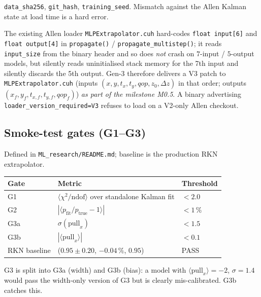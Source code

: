 \documentclass[a4paper,11pt]{article}
\newcommand{\dz}{\Delta z}
\begin{document}
\begin{description}
        \texttt{data\_sha256}, \texttt{git\_hash},
        \texttt{training\_seed}.  Mismatch against the Allen Kalman
        state at load time is a hard error.
  \item[A7 --- loader V3 patch.]  The existing Allen loader
        \texttt{MLPExtrapolator.cuh} hard-codes \texttt{float
        input[6]} and \texttt{float output[4]} in
        \texttt{propagate()} / \texttt{propagate\_multistep()}; it
        reads \texttt{input\_size} from the binary header and so
        does \emph{not} crash on $7$-input / $5$-output models, but
        silently reads uninitialised stack memory for the 7th input
        and silently discards the 5th output.  Gen-3 therefore
        delivers a V3 patch to \texttt{MLPExtrapolator.cuh} (inputs
        $(x,y,t_x,t_y,qop,z_0,\dz)$ in that order; outputs
        $(x_f,y_f,t_{x,f},t_{y,f},qop_f)$) \emph{as part of the
        milestone M0.5}.  A binary advertising
        \texttt{loader\_version\_required=V3} refuses to load on a
        V2-only Allen checkout.
\end{description}

\subsection{Smoke-test gates (G1--G3)}

Defined in \texttt{ML\_research/README.md}; baseline is the
production RKN extrapolator.

\begin{center}
\begin{tabular}{lll}
\toprule
Gate & Metric & Threshold \\
\midrule
G1 & $\langle\chi^2/\mathrm{ndof}\rangle$ over standalone Kalman fit & $<2.0$ \\
G2 & $|\langle p_\mathrm{fit}/p_\mathrm{true}-1\rangle|$            & $<1\,\%$ \\
G3a & $\sigma(\mathrm{pull}_x)$                                      & $<1.5$ \\
G3b & $|\langle\mathrm{pull}_x\rangle|$                             & $<0.1$ \\
\midrule
RKN baseline & ($0.95\pm0.20$,\; $-0.04\,\%$,\; $0.95$) & PASS \\
\bottomrule
\end{tabular}
\end{center}

G3 is split into G3a (width) and G3b (bias): a model with
$\langle\mathrm{pull}_x\rangle=-2$, $\sigma=1.4$ would pass the
width-only version of G3 but is clearly mis-calibrated.  G3b
catches this.
\end{document}

